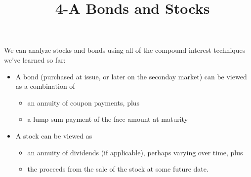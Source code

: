 \documentclass[12pt]{article}
\title{\normalfont\ 4-A Bonds and Stocks} %
\author{} %
\date{}  %
\begin{document}
\maketitle %

\vspace{-1.1in}

\begin{flushleft}
    We can analyze {stocks} and {bonds} using all of the compound interest techniques we've
    learned so far:
\end{flushleft}
\vspace{.05in}

\begin{itemize}
    \item A bond (purchased at issue, or later on the seconday market) can be viewed as a combination of
    \begin{itemize}
        \item an annuity of coupon payments, plus
        \item a lump sum payment of the face amount at maturity
    \end{itemize}
    \item A stock can be viewed as
    \begin{itemize}
        \item an annuity of dividends (if applicable), perhaps varying over time, plus
        \item the proceeds from the sale of the stock at some future date.
    \end{itemize}
\end{itemize}






\end{document}
